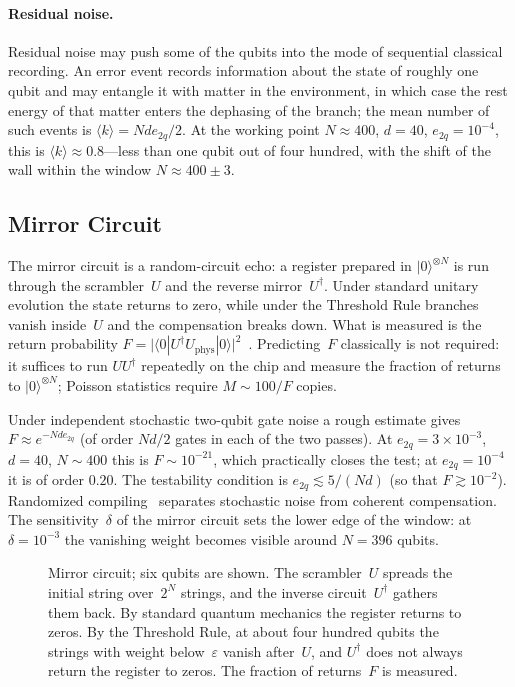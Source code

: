 \documentclass[11pt,a4paper]{article}
\newcommand{\CollapseRule}{Threshold Rule}
\newcommand{\CollapseRuleD}{the Threshold Rule}
\begin{document}
\paragraph{Residual noise.}
Residual noise may push some of the qubits into the mode of sequential classical recording. An error event records information about the state of roughly one qubit and may entangle it with matter in the environment, in which case the rest energy of that matter enters the dephasing of the branch; the mean number of such events is $\langle k\rangle = N d e_{2q}/2$. At the working point $N\approx400$, $d=40$, $e_{2q}=10^{-4}$, this is $\langle k\rangle\approx0.8$---less than one qubit out of four hundred, with the shift of the wall within the window $N\approx400\pm3$.

\subsection{Mirror Circuit}
\label{sec:mirror}

The mirror circuit is a random-circuit echo: a register prepared in $|0\rangle^{\otimes N}$ is run through the scrambler~$U$ and the reverse mirror~$U^\dagger$. Under standard unitary evolution the state returns to zero, while under the \CollapseRule{} branches vanish inside~$U$ and the compensation breaks down. What is measured is the return probability $F=\bigl|\langle 0|U^\dagger U_{\mathrm{phys}}|0\rangle\bigr|^2$~\cite{swingle2018}. Predicting~$F$ classically is not required: it suffices to run $U U^\dagger$ repeatedly on the chip and measure the fraction of returns to $|0\rangle^{\otimes N}$; Poisson statistics require $M\sim 100/F$ copies.

Under independent stochastic two-qubit gate noise a rough estimate gives $F\approx e^{-N d e_{2q}}$ (of order $N d/2$ gates in each of the two passes). At $e_{2q}=3\times 10^{-3}$, $d=40$, $N\sim400$ this is $F\sim10^{-21}$, which practically closes the test; at $e_{2q}=10^{-4}$ it is of order $0.20$. The testability condition is $e_{2q}\lesssim 5/(N d)$ (so that $F\gtrsim10^{-2}$). Randomized compiling~\cite{wallman2016} separates stochastic noise from coherent compensation. The sensitivity~$\delta$ of the mirror circuit sets the lower edge of the window: at $\delta=10^{-3}$ the vanishing weight becomes visible around $N=396$ qubits.

\begin{figure}[ht]
\centering

\caption{Mirror circuit; six qubits are shown. The scrambler~$U$ spreads the initial string over~$2^N$ strings, and the inverse circuit~$U^\dagger$ gathers them back. By standard quantum mechanics the register returns to zeros. By \CollapseRuleD{}, at about four hundred qubits the strings with weight below~$\varepsilon$ vanish after~$U$, and $U^\dagger$ does not always return the register to zeros. The fraction of returns~$F$ is measured.}
\label{fig:mirror}
\end{figure}
\end{document}
